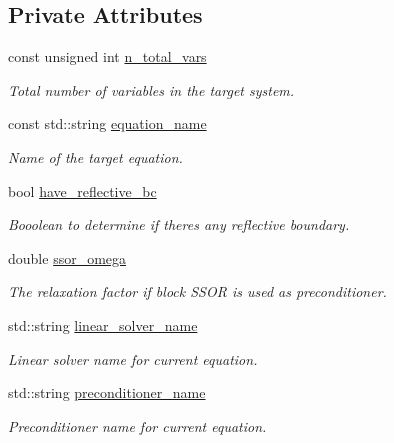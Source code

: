 \subsection*{Private Attributes}
\begin{DoxyCompactItemize}
\item 
const unsigned int \hyperlink{class_preconditioner_solver_ac2c59527a78b06037f0eb18132d8be63}{n\+\_\+total\+\_\+vars}
\begin{DoxyCompactList}\small\item\em Total number of variables in the target system. \end{DoxyCompactList}\item 
const std\+::string \hyperlink{class_preconditioner_solver_af20758bf54111e7092c49688622b1e54}{equation\+\_\+name}
\begin{DoxyCompactList}\small\item\em Name of the target equation. \end{DoxyCompactList}\item 
bool \hyperlink{class_preconditioner_solver_a954ef4f8c7d8206b277280a4b41aa9b1}{have\+\_\+reflective\+\_\+bc}
\begin{DoxyCompactList}\small\item\em Booolean to determine if there\textquotesingle{}s any reflective boundary. \end{DoxyCompactList}\item 
double \hyperlink{class_preconditioner_solver_ab9548e7699e82a2b006db283c59e4a80}{ssor\+\_\+omega}
\begin{DoxyCompactList}\small\item\em The relaxation factor if block S\+S\+OR is used as preconditioner. \end{DoxyCompactList}\item 
std\+::string \hyperlink{class_preconditioner_solver_ae13f7d32f80aad8eb1a4a9d1d2c4d019}{linear\+\_\+solver\+\_\+name}
\begin{DoxyCompactList}\small\item\em Linear solver name for current equation. \end{DoxyCompactList}\item 
std\+::string \hyperlink{class_preconditioner_solver_a2d8afd11d073e87487da0442486c3e48}{preconditioner\+\_\+name}
\begin{DoxyCompactList}\small\item\em Preconditioner name for current equation. \end{DoxyCompactList}\item 

\end{DoxyCompactItemize}
